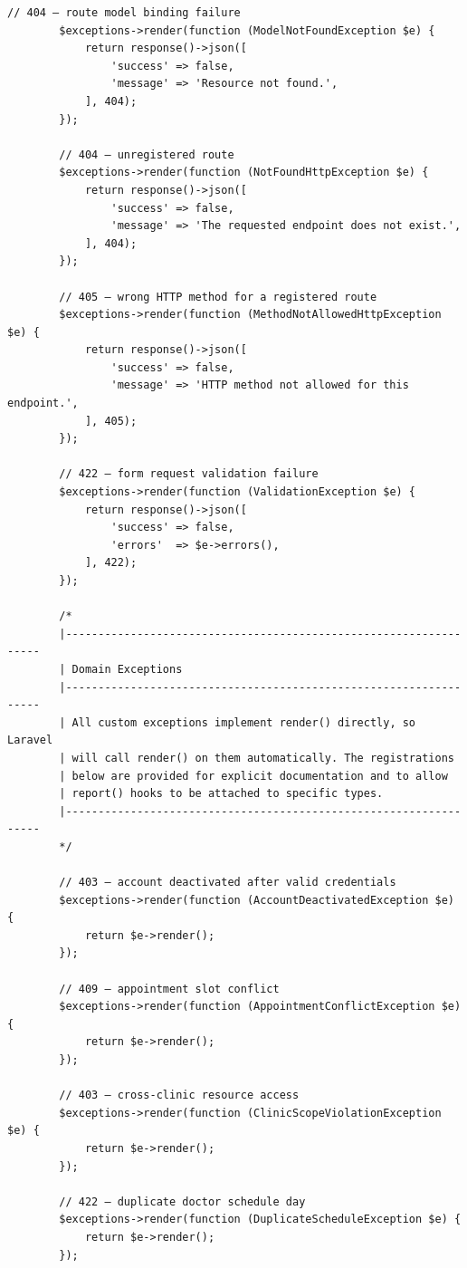\begin{lstlisting}[style=php, caption={\texttt{bootstrap/app.php} ---
  Complete exception handler registration for all custom exception
  types and Laravel framework exceptions.}]
        // 404 — route model binding failure
        $exceptions->render(function (ModelNotFoundException $e) {
            return response()->json([
                'success' => false,
                'message' => 'Resource not found.',
            ], 404);
        });

        // 404 — unregistered route
        $exceptions->render(function (NotFoundHttpException $e) {
            return response()->json([
                'success' => false,
                'message' => 'The requested endpoint does not exist.',
            ], 404);
        });

        // 405 — wrong HTTP method for a registered route
        $exceptions->render(function (MethodNotAllowedHttpException $e) {
            return response()->json([
                'success' => false,
                'message' => 'HTTP method not allowed for this endpoint.',
            ], 405);
        });

        // 422 — form request validation failure
        $exceptions->render(function (ValidationException $e) {
            return response()->json([
                'success' => false,
                'errors'  => $e->errors(),
            ], 422);
        });

        /*
        |------------------------------------------------------------------
        | Domain Exceptions
        |------------------------------------------------------------------
        | All custom exceptions implement render() directly, so Laravel
        | will call render() on them automatically. The registrations
        | below are provided for explicit documentation and to allow
        | report() hooks to be attached to specific types.
        |------------------------------------------------------------------
        */

        // 403 — account deactivated after valid credentials
        $exceptions->render(function (AccountDeactivatedException $e) {
            return $e->render();
        });

        // 409 — appointment slot conflict
        $exceptions->render(function (AppointmentConflictException $e) {
            return $e->render();
        });

        // 403 — cross-clinic resource access
        $exceptions->render(function (ClinicScopeViolationException $e) {
            return $e->render();
        });

        // 422 — duplicate doctor schedule day
        $exceptions->render(function (DuplicateScheduleException $e) {
            return $e->render();
        });


\end{lstlisting}
